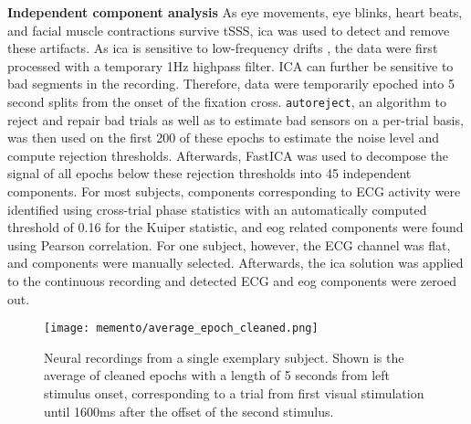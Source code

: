 \textbf{Independent component analysis} As eye movements, eye blinks, heart beats, and facial muscle contractions survive \gls{tSSS}, \gls{ica} was used to detect and remove these artifacts.
As \gls{ica} is sensitive to low-frequency drifts \citep{winkler2015ICA}, the data were first processed with a temporary 1Hz highpass filter. %
ICA can further be sensitive to bad segments in the recording.
Therefore, data were temporarily epoched into 5 second splits from the onset of the fixation cross.
\texttt{autoreject}, an algorithm to reject and repair bad trials as well as to estimate bad sensors on a per-trial basis, was then used on the first 200 of these epochs to estimate the noise level and compute rejection thresholds.
Afterwards, FastICA \citep{hyvarinen1999fast} was used to decompose the signal of all epochs below these rejection thresholds into 45 independent components.
For most subjects, components corresponding to ECG activity were identified using cross-trial phase statistics \citep{dammers2008integration} with an automatically computed threshold of 0.16 for the Kuiper statistic, and \gls{eog} related components were found using Pearson correlation.
For one subject, however, the ECG channel was flat, and components were manually selected.
Afterwards, the \gls{ica} solution was applied to the continuous recording and detected ECG and \gls{eog} components were zeroed out.

\begin{figure}
	\texttt{[image: memento/average\_epoch\_cleaned.png]}
	\caption[Average neural signal over the trial course]{Neural recordings from a single exemplary subject.
		Shown is the average of cleaned epochs with a length of 5 seconds from left stimulus onset, corresponding to a trial from first visual stimulation until
		1600ms after the offset of the second stimulus.}
	\label{fig:cleanepoch}
\end{figure}

